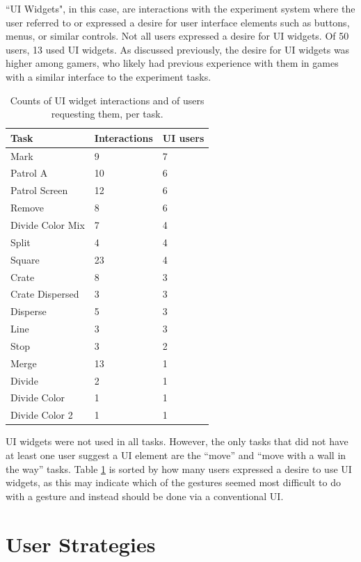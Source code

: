 ``UI Widgets", in this case, are interactions with the experiment system where the user referred to or expressed a desire for user interface elements such as buttons, menus, or similar controls.
Not all users expressed a desire for UI widgets. 
Of 50 users, 13 used UI widgets. 
As discussed previously, the desire for UI widgets was higher among gamers, who likely had previous experience with them in games with a similar interface to the experiment tasks. 

\begin{table}
	\begin{tabular}{l l l}
		Task & Interactions & UI users \\
		\hline
		Mark & 9 & 7\\
		Patrol A & 10 & 6\\
		Patrol Screen & 12 & 6\\
		Remove & 8 & 6 \\
		Divide Color Mix & 7 & 4\\
		Split & 4 & 4 \\
		Square & 23 & 4 \\
		Crate & 8 & 3 \\
		Crate Dispersed & 3 & 3\\
		Disperse & 5 & 3\\
		Line & 3 & 3\\
		Stop & 3 & 2 \\
		Merge & 13 & 1\\
		Divide & 2 & 1\\
		Divide Color & 1 & 1\\
		Divide Color 2 & 1 & 1\\
		
	\end{tabular}
	\caption{Counts of UI widget interactions and of users requesting them, per task.}
	\label{tab:widget_counts_task}
\end{table}


UI widgets were not used in all tasks. 
However, the only tasks that did not have at least one user suggest a UI element are the ``move'' and ``move with a wall in the way'' tasks. 
Table \ref{tab:widget_counts_task} is sorted by how many users expressed a desire to use UI widgets, as this may indicate which of the gestures seemed most difficult to do with a gesture and instead should be done via a conventional UI. 


\section{User Strategies}

